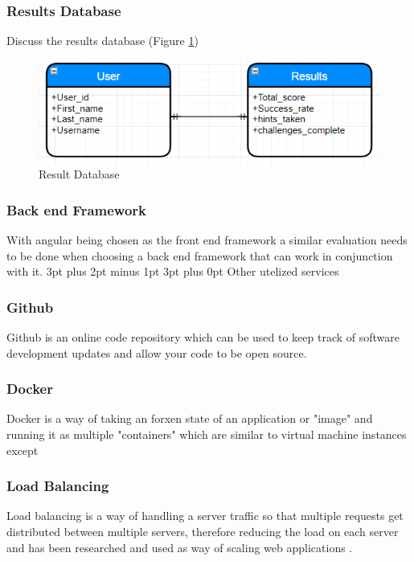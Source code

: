 \documentclass[12pt,a4paper]{article}
\makeatletter
\renewcommand\subsection{\@startsection {subsection}{1}{2mm} %
                               {3pt plus 2pt minus 1pt} %
                               {3pt plus 0pt} %
                               {\normalfont\bfseries}}
\makeatother
\begin{document}
\subsubsection{Results Database}   
Discuss the results database (Figure \ref{ResultsDB})

\begin{figure}[h]
    \centering
    \includegraphics[width=1.0\textwidth]{Figs/Result_Db.PNG} 
    \caption{Result Database} 
    \label{ResultsDB}
\end{figure} 

\subsubsection{Back end Framework} 
With angular being chosen as the front end framework a similar evaluation needs to be done when choosing a back end framework that can work in conjunction with it.
\subsection{Other utelized services} 
\subsubsection{Github}  
Github is an online code repository which can be used to keep track of software development updates and allow your code to be open source. 
\subsubsection{Docker}  
Docker is a way of taking an forxen state of an application or "image" and running it as multiple "containers" which are similar to virtual machine instances except  
\subsubsection{Load Balancing} 
Load balancing is a way of handling a server traffic so that multiple requests get distributed between multiple servers, therefore reducing the load on each server and has been researched and used as way of scaling web applications \cite{chieu2009dynamic}.
\end{document}
